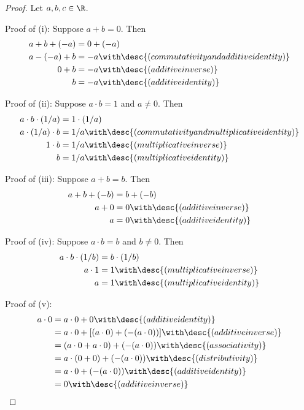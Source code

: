 \begin{proof}
  \def\a{{-}a}\def\b{{-}b}
  Let $a,b,c\in\R$.

  Proof of (i): Suppose $a+b=0$. Then
  \begin{align*}
    a+b+(\a) &=0+(\a)                                              \\
    a-(\a)+b &=\a\with\desc{(commutativity and additive identity)} \\
    0+b      &=\a\with\desc{(additive inverse)}                    \\
    b        &=\a\with\desc{(additive identity)}
  \end{align*}

  Proof of (ii): Suppose $a\cdot b=1$ and $a\neq0$. Then
  \begin{align*}
    a\cdot b\cdot(1/a) &=1\cdot(1/a)                                                \\
    a\cdot(1/a)\cdot b &=1/a\with\desc{(commutativity and multiplicative identity)} \\
    1\cdot b           &=1/a\with\desc{(multiplicative inverse)}                    \\
    b                  &=1/a\with\desc{(multiplicative identity)}
  \end{align*}

  Proof of (iii): Suppose $a+b=b$. Then
  \begin{align*}
    a+b+(\b) &=b+(\b)                           \\
    a+0      &=0\with\desc{(additive inverse)}  \\
    a        &=0\with\desc{(additive identity)}
  \end{align*}

  Proof of (iv): Suppose $a\cdot b=b$ and $b\neq0$. Then
  \begin{align*}
    a\cdot b\cdot(1/b) &=b\cdot(1/b)                            \\
    a\cdot1            &=1\with\desc{(multiplicative inverse)}  \\
    a                  &=1\with\desc{(multiplicative identity)}
  \end{align*}

  Proof of (v):
  \begin{align*}
    a\cdot0 &= a\cdot0+0\with\desc{(additive identity)}                         \\
            &= a\cdot0+[(a\cdot0)+({-}(a\cdot0))]\with\desc{(additive inverse)} \\
            &= (a\cdot0+a\cdot0)+({-}(a\cdot0))\with\desc{(associativity)}      \\
            &= a\cdot(0+0)+({-}(a\cdot0))\with\desc{(distributivity)}           \\
            &= a\cdot0+({-}(a\cdot0))\with\desc{(additive identity)}            \\
            &= 0\with\desc{(additive inverse)}                                  \\
  \end{align*}


\end{proof}

